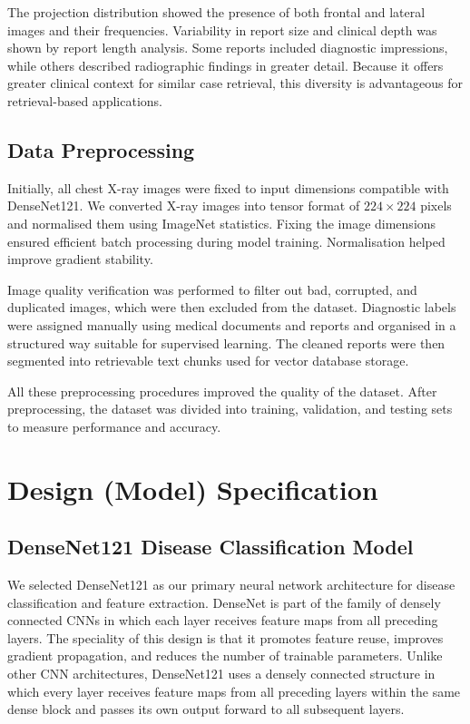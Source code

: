 The projection distribution showed the presence of both frontal and lateral images and their
frequencies. Variability in report size and clinical depth was shown by report length analysis.
Some reports included diagnostic impressions, while others described radiographic findings in
greater detail. Because it offers greater clinical context for similar case retrieval, this diversity
is advantageous for retrieval-based applications.

\subsection{Data Preprocessing}

Initially, all chest X-ray images were fixed to input dimensions compatible with DenseNet121.
We converted X-ray images into tensor format of $224 \times 224$ pixels and normalised them
using ImageNet statistics. Fixing the image dimensions ensured efficient batch processing
during model training. Normalisation helped improve gradient stability.

Image quality verification was performed to filter out bad, corrupted, and duplicated images,
which were then excluded from the dataset. Diagnostic labels were assigned manually using
medical documents and reports and organised in a structured way suitable for supervised
learning. The cleaned reports were then segmented into retrievable text chunks used for vector
database storage.

All these preprocessing procedures improved the quality of the dataset. After preprocessing,
the dataset was divided into training, validation, and testing sets to measure performance and
accuracy.

\section{Design (Model) Specification}

\subsection{DenseNet121 Disease Classification Model}

We selected DenseNet121 as our primary neural network architecture for disease
classification and feature extraction. DenseNet is part of the family of densely connected
CNNs in which each layer receives feature maps from all preceding layers. The speciality of
this design is that it promotes feature reuse, improves gradient propagation, and reduces the
number of trainable parameters. Unlike other CNN architectures, DenseNet121 uses a densely
connected structure in which every layer receives feature maps from all preceding layers
within the same dense block and passes its own output forward to all subsequent layers.

